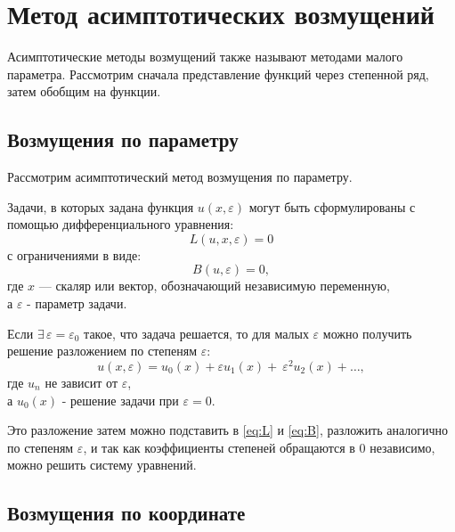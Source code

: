 \chapter*{Метод асимптотических возмущений}

Асимптотические методы возмущений
также называют методами малого параметра.
Рассмотрим сначала представление функций
через степенной ряд, затем обобщим на функции.

\section*{Возмущения по параметру}
Рассмотрим асимптотический метод возмущения по параметру.

Задачи, в которых задана функция $u(x, \varepsilon)$
могут быть сформулированы с помощью
дифференциального уравнения:
\begin{equation}
    \label{eq:L}
    L(u, x, \varepsilon) = 0
\end{equation}
с ограничениями в виде:
\begin{equation}
    \label{eq:B}
    B(u, \varepsilon) = 0,
\end{equation}
где $x$ --- скаляр или вектор, обозначающий независимую переменную,\\
а $\varepsilon$ - параметр задачи.

Если $\exists \, \varepsilon = \varepsilon_0$
такое, что задача решается, то для малых $\varepsilon$
можно получить решение разложением по степеням $\varepsilon$:
\begin{equation*}
   u(x, \varepsilon) = u_0(x) + \varepsilon u_1(x) + \
   \varepsilon^2 u_2(x) + \dots,
\end{equation*}
где $u_n$ не зависит от $\varepsilon$,\\
а $u_0(x)$ - решение задачи при $\varepsilon = 0$.

Это разложение затем можно подставить
в \eqref{eq:L} и \eqref{eq:B},
разложить аналогично по степеням $\varepsilon$,
и так как коэффициенты степеней обращаются в 0 независимо,
можно решить систему уравнений.

\clearpage
\section*{Возмущения по координате}

